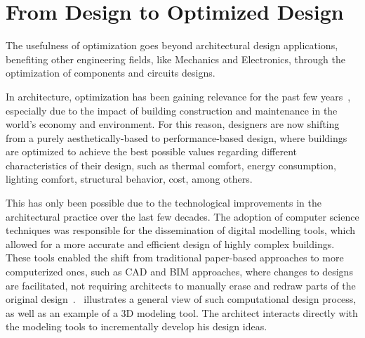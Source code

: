 \section{From Design to Optimized Design}
	
	The usefulness of optimization goes beyond architectural design applications, benefiting other engineering fields, like Mechanics and Electronics, through the optimization of components and circuits designs. 
	
	In architecture, optimization has been gaining relevance for the past few years~\cite{Cichocka2017SURVEY}, especially due to the impact of building construction and maintenance in the world's economy and environment. For this reason, designers are now shifting from a purely aesthetically-based to performance-based design, where buildings are optimized to achieve the best possible values regarding different characteristics of their design, such as thermal comfort, energy consumption, lighting comfort, structural behavior, cost, among others.

	This has only been possible due to the technological improvements in the architectural practice over the last few decades. The adoption of computer science techniques was responsible for the dissemination of digital modelling tools, which allowed for a more accurate and efficient design of highly complex buildings. These tools enabled the shift from traditional paper-based approaches to more computerized ones, such as \ac{CAD} and \ac{BIM} approaches, where changes to designs are facilitated, not requiring architects to manually erase and redraw parts of the original design~\cite{Ferreira2015GD}.~ illustrates a general view of such computational design process, as well as an example of a 3D modeling tool. The architect interacts directly with the modeling tools to incrementally develop his design ideas.
	
